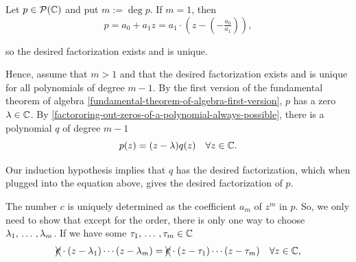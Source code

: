 \begin{prf}
  Let $p \in \mathcal{P}(\mathbb{C})$ and put $m := \deg p$. If $m = 1$, then
  \[
    p = a_0 + a_1 z = a_1 \cdot \left(z-\left(-\tfrac{a_0}{a_1}\right) \right),
  \]

  so the desired factorization exists and is unique.

  Hence, assume that $m > 1$ and that the desired factorization exists and is unique for all polynomials of degree $m-1$.
  By the first version of the fundamental theorem of algebra \ref{fundamental-theorem-of-algebra-first-version}, $p$ has a zero $\lambda \in \mathbb{C}$. By \ref{factororing-out-zeros-of-a-polynomial-always-possible}, there is a polynomial $q$ of degree $m-1$ \st
  \[
    p(z) = (z-\lambda) q(z) \quad \forall z \in \mathbb{C}.
  \]

  Our induction hypothesis implies that $q$ has the desired factorization, which when plugged into the equation above, gives the desired factorization of $p$.

   The number $c$ is uniquely determined as the coefficient $a_m$ of $z^m$ in $p$. So, we only need to show that except for the order, there is only one way to choose $\lambda_1, {\, \ldots \,\,}, \lambda_m$. If we have some $\tau_1, {\, \ldots \,\,}, \tau_m \in \mathbb{C}$ \st
  \begin{equation}
    \xcancel{\mathlarger{c}} \cdot (z - \lambda_1) \cdots (z-\lambda_m) = \xcancel{\mathlarger{c}} \cdot (z-\tau_1) \cdots (z-\tau_m) \quad \forall z \in \compl,
  \end{equation}



\end{prf}
